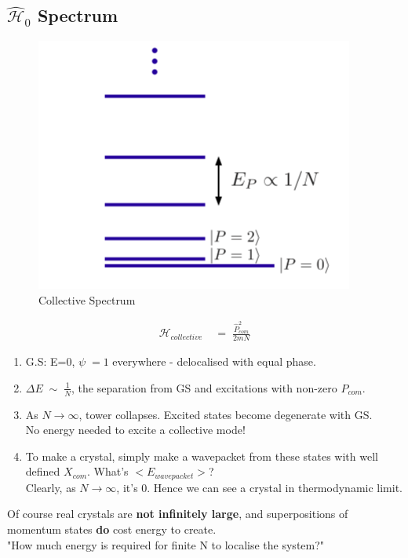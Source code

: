 \documentclass[12pt]{article}
\begin{document}
\subsection{$\mathcal{\hat{H}}_0$ Spectrum}
 
\begin{figure}[h]
    \centering
    \includegraphics[scale=0.8]{Screen Shot 2020-07-22 at 19.42.20.png}
    \caption{Collective Spectrum}
    \label{fig:my_label}
\end{figure}
\begin{align}
    \mathcal{H}_{collective}\;&=\;\frac{\hat{P}^2_{com}}{2mN}
\end{align}
\begin{enumerate}
    \item G.S: E=0, $\psi\;=1$ everywhere - delocalised with equal phase.
    \item 
    $\Delta E\;\sim\;\frac{1}{N}$, the separation from GS and excitations with non-zero $P_{com}$.
    \item As ${N\to\infty}$, tower collapses. Excited states become degenerate with GS.\\
    No energy needed to excite a collective mode!
    \item To make a crystal, simply make a wavepacket from these states with well defined $X_{com}$. What's $<E_{wavepacket}>$?\\
    Clearly, as ${N\to\infty}$, it's 0. Hence we can see a crystal in thermodynamic limit.
\end{enumerate}
Of course real crystals are \textbf{not infinitely large}, and superpositions of momentum states \textbf{do} cost energy to create.\\
\newline
"How much energy is required for finite N to localise the system?"\\
\end{document}
